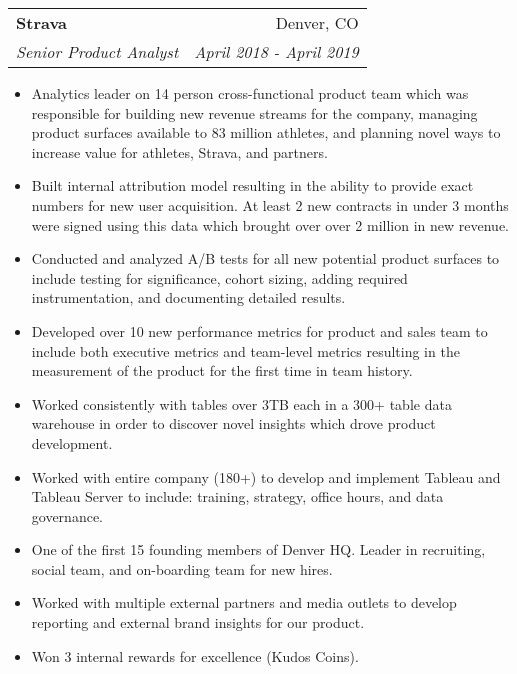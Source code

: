 \documentclass[letterpaper,11pt]{article}
\makeatletter
\newcommand{\resumeItem}[2]{
  \item\small{
    {#1}{ #2 \vspace{-2pt}}
  }
}
\newcommand{\resumeSubheading}[4]{
  \vspace{-2pt}\item
    \begin{tabular*}{0.97\textwidth}{l@{\extracolsep{\fill}}r}
      \textbf{#1} & #2 \\
      \textit{\small#3} & \textit{\small #4} \\
    \end{tabular*}\vspace{-5pt}
}
\newcommand{\resumeItemListStart}{\begin{itemize}}
\newcommand{\resumeItemListEnd}{\end{itemize}\vspace{-5pt}}
\makeatother
\begin{document}
    \resumeSubheading
      {Strava}{Denver, CO}
      {Senior Product Analyst}{April 2018 - April 2019}
      \resumeItemListStart
        \resumeItem{}
          {Analytics leader on 14 person cross-functional product team which was responsible for building new revenue streams for the company, managing product surfaces available to 83 million athletes, and planning novel ways to increase value for athletes, Strava, and partners.}
        \resumeItem{}
          {Built internal attribution model resulting in the ability to provide exact numbers for new user acquisition. At least 2 new contracts in under 3 months were signed using this data which brought over over 2 million in new revenue.}
        \resumeItem{}
          {Conducted and analyzed A/B tests for all new potential product surfaces to include testing for significance, cohort sizing, adding required instrumentation, and documenting detailed results.}
        \resumeItem{}
          {Developed over 10 new performance metrics for product and sales team to include both executive metrics and team-level metrics resulting in the measurement of the product for the first time in team history.}
        \resumeItem{}
          {Worked consistently with tables over 3TB each in a 300+ table data warehouse in order to discover novel insights which drove product development.}
        \resumeItem{}
          {Worked with entire company (180+) to develop and implement Tableau and Tableau Server to include: training, strategy, office hours, and data governance.}
        \resumeItem{}
          {One of the first 15 founding members of Denver HQ. Leader in recruiting, social team, and on-boarding team for new hires.}
        \resumeItem{}
          {Worked with multiple external partners and media outlets to develop reporting and external brand insights for our product.}
        \resumeItem{}
          {Won 3 internal rewards for excellence (Kudos Coins).}
      \resumeItemListEnd
\end{document}
